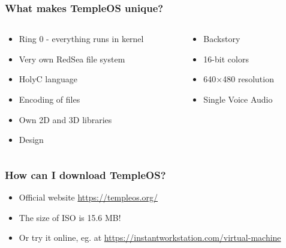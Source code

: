 \documentclass{beamer}
\begin{document}
	\begin{frame}
		\frametitle{What makes TempleOS unique?}
		\begin{columns}
			\begin{column}{0.5\textwidth} %
				\begin{itemize}
					\item Ring 0 - everything runs in kernel

					\item Very own RedSea file system

					\item HolyC language

					\item Encoding of files

					\item Own 2D and 3D libraries

					\item Design
				\end{itemize}
			\end{column}

			\begin{column}{0.5\textwidth} %
				\begin{itemize}
					\item Backstory

					\item 16-bit colors

					\item 640$\times$480 resolution

					\item Single Voice Audio
				\end{itemize}
			\end{column}
		\end{columns}
	\end{frame}

	\begin{frame}
		\frametitle{How can I download TempleOS?}
		\begin{itemize}
			\item Official website \url{https://templeos.org/}

			\item The size of ISO is 15.6 MB!

			\item Or try it online, eg. at \url{https://instantworkstation.com/virtual-machine}
		\end{itemize}
	\end{frame}
\end{document}
